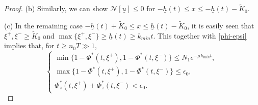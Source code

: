 \documentclass[11pt]{amsart}
\numberwithin{equation}{section}
\begin{document}
\begin{proof}
(b) Similarly, we can show  $\mathcal{N}[\underline{u}]\leq 0$ for $-\underline{h}(t)\leq x\leq -\underline{h}(t)-\tilde{K}_0$.
 \medskip
 
(c) In  the remaining case   $ -\underline{h}(t)+\tilde{K}_0\leq x\leq \underline{h}(t)-\tilde{K}_0$, it is easily seen that  $\xi^+,\xi^-\geq \tilde{K}_0$ and $\max\{\xi^+,\xi^-\}\geq \underline{h}(t)\geq  k_{min}t$. This together with \eqref{phi-epsi} implies that, for $t\geq n_0T\gg1$,  
\begin{equation}\label{eq-mami}
   \begin{cases} \min\{1-\Phi^*(t,\xi^+), 1-\Phi^*(t,\xi^-)\}\leq N_1e^{-\mu k_{min}t},\ \\ 
   \max\{1-\Phi^*(t,\xi^+), 1-\Phi^*(t,\xi^-)\}\leq \epsilon_0,\ \\
   \Phi^*_z(t,\xi^+)+\Phi^*_z(t,\xi^-)<\epsilon_0.
   \end{cases}
\end{equation}


\end{proof}
\end{document}
